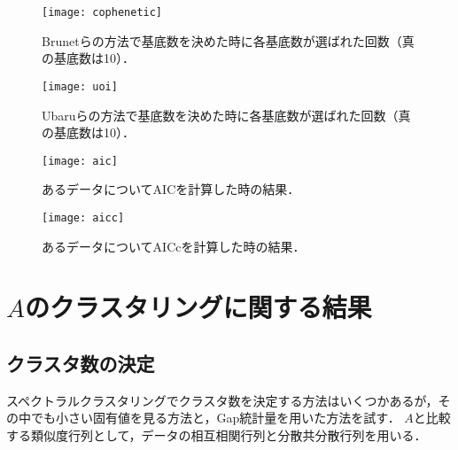 \begin{figure}[htbp]
    \begin{minipage}{0.5\hsize}
        \begin{center}
            \texttt{[image: cophenetic]}
						\caption{Brunetらの方法で基底数を決めた時に各基底数が選ばれた回数（真の基底数は10）．}
            \label{fig:cophenetic}
        \end{center}
    \end{minipage}
    \begin{minipage}{0.5\hsize}
        \begin{center}
            \texttt{[image: uoi]}
						\caption{Ubaruらの方法で基底数を決めた時に各基底数が選ばれた回数（真の基底数は10）．}
            \label{fig:uoi}
        \end{center}
    \end{minipage}
\end{figure}
\begin{figure}[htbp]
    \begin{minipage}{0.5\hsize}
        \begin{center}
            \texttt{[image: aic]}
						\caption{あるデータについてAICを計算した時の結果．}
            \label{fig:aic}
        \end{center}
    \end{minipage}
    \begin{minipage}{0.5\hsize}
        \begin{center}
						\texttt{[image: aicc]}
						\caption{あるデータについてAICc\cite{Symonds2011}を計算した時の結果．}
            \label{fig:aicc}
        \end{center}
    \end{minipage}
\end{figure}

\section{$A$のクラスタリングに関する結果}
\subsection{クラスタ数の決定}
スペクトラルクラスタリングでクラスタ数を決定する方法はいくつかあるが，その中でも小さい固有値を見る方法と，Gap統計量を用いた方法を試す．
$A$と比較する類似度行列として，データの相互相関行列と分散共分散行列を用いる．
